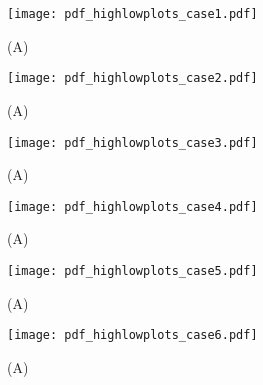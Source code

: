 \clearpage




\begin{figure}%
	\centering
	\texttt{[image: pdf\_highlowplots\_case1.pdf]}
	\caption{ 
		(A) 
	}
	\label{fig:CRP:XXX}
\end{figure}%
\begin{figure}%
	\centering
	\texttt{[image: pdf\_highlowplots\_case2.pdf]}
	\caption{ 
		(A) 
	}
	\label{fig:CRP:XXX}
\end{figure}%
\begin{figure}%
	\centering
	\texttt{[image: pdf\_highlowplots\_case3.pdf]}
	\caption{ 
		(A) 
	}
	\label{fig:CRP:XXX}
\end{figure}%
\begin{figure}%
	\centering
	\texttt{[image: pdf\_highlowplots\_case4.pdf]}
	\caption{ 
		(A) 
	}
	\label{fig:CRP:XXX}
\end{figure}%
\begin{figure}%
	\centering
	\texttt{[image: pdf\_highlowplots\_case5.pdf]}
	\caption{ 
		(A) 
	}
	\label{fig:CRP:XXX}
\end{figure}%
\begin{figure}%
	\centering
	\texttt{[image: pdf\_highlowplots\_case6.pdf]}
	\caption{ 
		(A) 
	}
	\label{fig:CRP:XXX}
\end{figure}%






